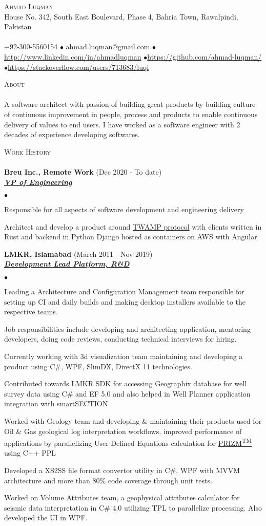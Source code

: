 \documentclass{article}
\newcommand{\lineunder}{\vspace*{-8pt} \\ \hspace*{-18pt} \hrulefill \\}
\newcommand{\header}[1]{{\hspace*{-15pt}\vspace*{6pt} \textsc{#1}} \vspace*{-6pt} \lineunder}
\newcommand{\employer}[3]{{ \textbf{#1} (#2)\\ \underline{\textbf{\emph{#3}}}\\  }}
\newcommand{\contact}[3]{
\vspace*{-8pt}
\begin{center}
{\LARGE \scshape {#1}}\\
#2 \lineunder 
#3
\end{center}
\vspace*{-8pt}
}
\newenvironment{achievements}{\begin{list}{$\bullet$}{\topsep 0pt \itemsep -2pt}}{\vspace*{4pt}\end{list}}
\begin{document}
\small
\smallskip
\vspace*{-44pt}

\contact{Ahmad Luqman}
{House No. 342, South East Boulevard, Phase 4, Bahria Town, Rawalpindi, Pakistan}
{+92-300-5560154 $\bullet$ ahmad.luqman@gmail.com  $\bullet$\url{http://www.linkedin.com/in/ahmadluqman} $\bullet$\url{https://github.com/ahmad-luqman/} $\bullet$\url{https://stackoverflow.com/users/713683/luqi}}

\header{About}
A software architect with passion of building great products by building culture of continuous improvement in people, process and products to enable continuous delivery of values to end users. I have worked as a software engineer with 2 decades of experience developing softwares.
\vspace*{6pt}

\header{Work History}
\employer{Breu Inc., Remote Work}{Dec 2020 - To date}{VP of Engineering}
	\begin{achievements}
	\item Responsible for all aspects of software development and engineering delivery
	\item Architect and develop a product around \href{https://tools.ietf.org/html/rfc5357}{TWAMP protocol} with clients written in Rust and backend in Python Django hosted as containers on AWS with Angular 
	\end{achievements}

\employer{LMKR, Islamabad}{March 2011 - Nov 2019}{Development Lead Platform, R\&D}
	\begin{achievements}
	\item Leading a Architecture and Configuration Management team responsible for setting up CI and daily builds and making desktop installers available to the respective teams.
	\item Job responsibilities include developing and architecting application, mentoring developers, doing code reviews, conducting technical interviews for hiring. 
	\item Currently working with 3d visualization team maintaining and developing a product using C\#, WPF, SlimDX, DirectX 11 technologies.
	\item Contributed towards LMKR SDK for accessing Geographix database for well survey data using C\# and EF 5.0 and also helped in Well Planner application integration with smartSECTION
	\item Worked with Geology team and developing \& maintaining their products used for Oil \& Gas geological log interpretation workflows, improved performance of applications by parallelizing User Defined Equations calculation for \href{http://www.lmkr.com/geographix/by-solution/geographix-suite/prizm%E2%84%A2/}{PRIZM\textsuperscript{TM}} using C++ PPL 
	\item Developed a XS2SS file format convertor utility in C\#, WPF with MVVM architecture and more than 80\% code coverage through unit tests.
	\item Worked on Volume Attributes team, a geophysical attributes calculator for seismic data interpretation in C\# 4.0 utilizing TPL to parallelize processing. Also developed the UI in WPF.  
	\end{achievements}
\end{document}
